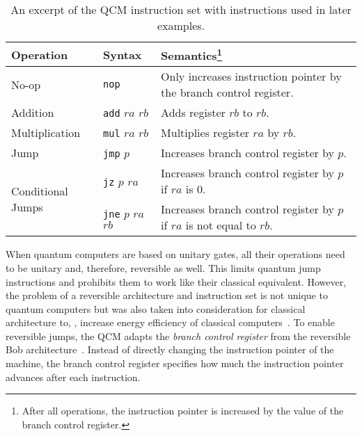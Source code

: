 \begin{table}[htp]
    \centering
    \begin{tabular}{llp{}}
        \multicolumn{1}{l|}{Operation}                          & \multicolumn{1}{l|}{Syntax}                                      & Semantics\footnote{After all operations, the instruction pointer is increased by the value of the branch control register.}                                                              \\ \hline
        
        \multicolumn{1}{l|}{No-op}                              & \multicolumn{1}{l|}{\texttt{nop}}               & Only increases instruction pointer by the branch control register.     \\ \hline
        
        \multicolumn{1}{l|}{Addition}                           & \multicolumn{1}{l|}{\texttt{add} $ra$ $rb$}     & Adds register $rb$ to $rb$.                                            \\
        \multicolumn{1}{l|}{Multiplication}                     & \multicolumn{1}{l|}{\texttt{mul} $ra$ $rb$}     & Multiplies register $ra$ by $rb$.                                      \\ \hline
        
        \multicolumn{1}{l|}{Jump}                               & \multicolumn{1}{l|}{\texttt{jmp} $p$}           & Increases branch control register by $p$.                              \\
        \multicolumn{1}{l|}{\multirow{2}{*}{Conditional Jumps}} & \multicolumn{1}{l|}{\texttt{jz} $p$ $ra$}       & Increases branch control register by $p$ if $ra$ is $0$.               \\
        \multicolumn{1}{l|}{}                                   & \multicolumn{1}{l|}{\texttt{jne} $p$ $ra$ $rb$} & Increases branch control register by $p$ if $ra$ is not equal to $rb$. 
    \end{tabular}
    \caption{An excerpt of the QCM instruction set with instructions used in later examples.}
    \label{tab:qcm_instructionset}
\end{table}

When quantum computers are based on unitary gates, all their operations need to be unitary and, therefore, reversible as well. This limits quantum jump instructions and prohibits them to work like their classical equivalent. However, the problem of a reversible architecture and instruction set is not unique to quantum computers but was also taken into consideration for classical architecture to, \eg, increase energy efficiency of classical computers~\cite{AGY07, TAG12}. 
To enable reversible jumps, the QCM adapts the \emph{branch control register} from the reversible Bob architecture~\cite{TAG12}. Instead of directly changing the instruction pointer of the machine, the branch control register specifies how much the instruction pointer advances after each instruction.

